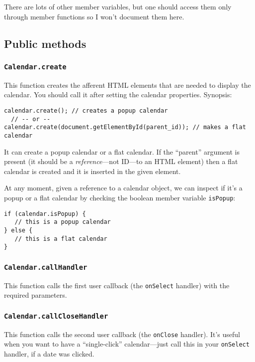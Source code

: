 \documentclass[a4paper,10pt]{article}
\begin{document}
There are lots of other member variables, but one should access them only
through member functions so I won't document them here.

\subsection{Public methods}

\subsubsection{\texttt{Calendar.create}}\label{sec:Calendar.create}

This function creates the afferent HTML elements that are needed to display the
calendar.  You should call it after setting the calendar properties.  Synopsis:
\begin{verbatim}
calendar.create(); // creates a popup calendar
  // -- or --
calendar.create(document.getElementById(parent_id)); // makes a flat calendar
\end{verbatim}

It can create a popup calendar or a flat calendar.  If the ``parent'' argument
is present (it should be a \emph{reference}---not ID---to an HTML element) then
a flat calendar is created and it is inserted in the given element.

At any moment, given a reference to a calendar object, we can inspect if it's a
popup or a flat calendar by checking the boolean member variable
\texttt{isPopup}:

\begin{verbatim}
if (calendar.isPopup) {
   // this is a popup calendar
} else {
   // this is a flat calendar
}
\end{verbatim}

\subsubsection{\texttt{Calendar.callHandler}}\label{sec:Calendar.callHandler}

This function calls the first user callback (the
\texttt{onSelect} handler) with the required parameters.

\subsubsection{\texttt{Calendar.callCloseHandler}}\label{sec:Calendar.callCloseHandler}

This function calls the second user callback (the
\texttt{onClose} handler).  It's useful when you want to have a
``single-click'' calendar---just call this in your \texttt{onSelect} handler,
if a date was clicked.
\end{document}
